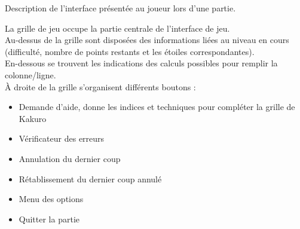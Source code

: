 {
    Description de l'interface présentée au joueur lors d'une partie.
    \label{fonc:interface}
}
{
    La grille de jeu occupe la partie centrale de l'interface de jeu.\\
    Au-dessus de la grille sont disposées des informations liées au niveau en cours (difficulté, nombre de points restants et les étoiles correspondantes).\\
    En-dessous se trouvent les indications des calculs possibles pour remplir la colonne/ligne.\\
    À droite de la grille s'organisent différents boutons :
    \noexpand\begin{itemize}
        \noexpand\item Demande d'aide, donne les indices et techniques pour compléter la grille de Kakuro
        \noexpand\item Vérificateur des erreurs
        \noexpand\item Annulation du dernier coup
        \noexpand\item Rétablissement du dernier coup annulé
        \noexpand\item Menu des options
        \noexpand\item Quitter la partie
    \noexpand\end{itemize}
}